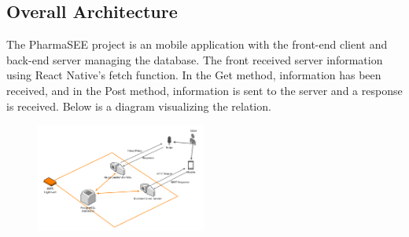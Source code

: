 \documentclass[conference]{IEEEtran}
\begin{document}
\subsection{Overall Architecture}

The PharmaSEE project is an mobile application with the front-end client and back-end server managing the database. The front received server information using React Native's fetch function. In the Get method, information has been received, and in the Post method, information is sent to the server and a response is received. Below is a diagram visualizing the relation.

\begin{figure}[h!]
\centering
\includegraphics[width=0.5\textwidth,height=0.25\textheight]{imagefolder/arch.png}
\caption{}
\label{fig:map}
\end{figure}
\end{document}
